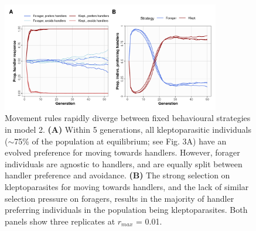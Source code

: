 \documentclass[11pt]{article}
\begin{document}
\begin{figure}[h!]
    \centering
    \includegraphics[width=0.85\textwidth]{figures/fig_07.png}
    \caption{
       Movement rules rapidly diverge between fixed behavioural strategies in model 2.
       \textbf{(A)} Within 5 generations, all kleptoparasitic individuals ($\sim$75\% of the population at equilibrium; see Fig. 3A) have an evolved preference for moving towards handlers.
       However, forager individuals are agnostic to handlers, and are equally split between handler preference and avoidance.
       \textbf{(B)} The strong selection on kleptoparasites for moving towards handlers, and the lack of similar selection pressure on foragers, results in the majority of handler preferring individuals in the population being kleptoparasites.
       Both panels show three replicates at $r_{max}$ = 0.01.
    }
    \label{Fig:Syndrome}
\end{figure}







\end{document}

